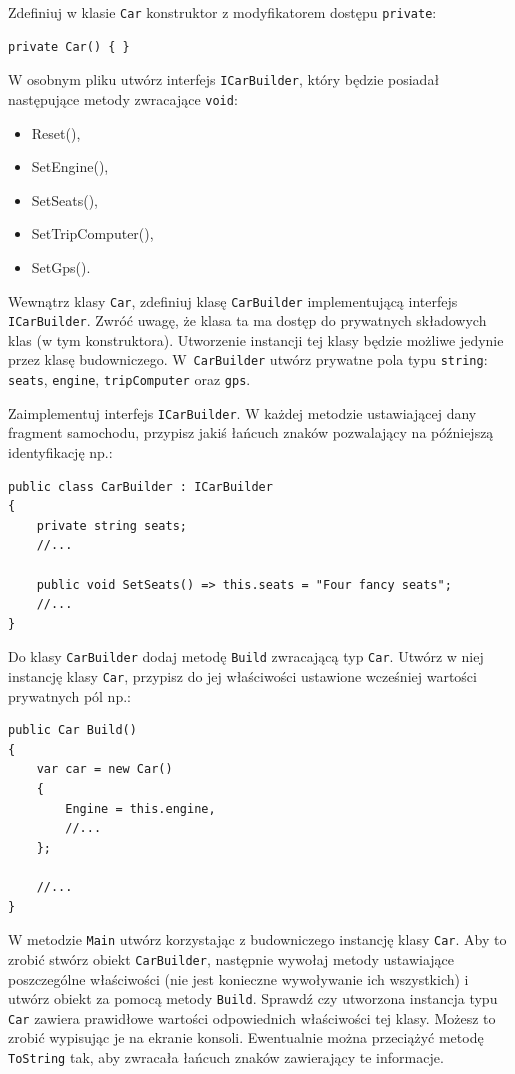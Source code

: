 Zdefiniuj w klasie \texttt{Car} konstruktor z modyfikatorem dostępu \texttt{private}:
\begin{lstlisting}
private Car() { }
\end{lstlisting}

W osobnym pliku utwórz interfejs \texttt{ICarBuilder}, który będzie posiadał następujące metody zwracające \texttt{void}:
\begin{itemize}
	\item Reset(),
	\item SetEngine(),
	\item SetSeats(),
	\item SetTripComputer(),
	\item SetGps().
\end{itemize}

Wewnątrz klasy \texttt{Car}, zdefiniuj klasę \texttt{CarBuilder} implementującą interfejs \texttt{ICarBuilder}. Zwróć uwagę, że klasa ta ma dostęp do prywatnych składowych klas (w tym konstruktora). Utworzenie instancji tej klasy będzie możliwe jedynie przez klasę budowniczego. W~\texttt{CarBuilder} utwórz prywatne pola typu \texttt{string}: \texttt{seats}, \texttt{engine}, \texttt{tripComputer} oraz \texttt{gps}.

Zaimplementuj interfejs \texttt{ICarBuilder}. W każdej metodzie ustawiającej dany fragment samochodu, przypisz jakiś łańcuch znaków pozwalający na późniejszą identyfikację np.:
\begin{lstlisting}
public class CarBuilder : ICarBuilder
{
	private string seats;
	//...
	
	public void SetSeats() => this.seats = "Four fancy seats";
	//...		
}
\end{lstlisting}

Do klasy \texttt{CarBuilder} dodaj metodę \texttt{Build} zwracającą typ \texttt{Car}. Utwórz w niej instancję klasy \texttt{Car}, przypisz do jej właściwości ustawione wcześniej wartości prywatnych pól np.:
\begin{lstlisting}
public Car Build()
{
	var car = new Car()
	{
		Engine = this.engine,
		//...
	};
	
	//...
}
\end{lstlisting}

W metodzie \texttt{Main} utwórz korzystając z budowniczego instancję klasy \texttt{Car}. Aby to zrobić stwórz obiekt \texttt{CarBuilder}, następnie wywołaj metody ustawiające poszczególne właściwości (nie jest konieczne wywoływanie ich wszystkich) i utwórz obiekt za pomocą metody \texttt{Build}. Sprawdź czy utworzona instancja typu \texttt{Car} zawiera prawidłowe wartości odpowiednich właściwości tej klasy.  Możesz to zrobić wypisując je na ekranie konsoli. Ewentualnie można przeciążyć metodę \texttt{ToString} tak, aby zwracała łańcuch znaków zawierający te informacje.

